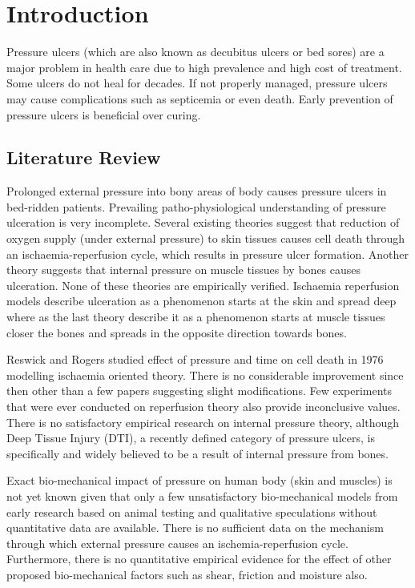 \chapter{Introduction}
\label{chapter:introduction}

Pressure ulcers (which are also known as decubitus ulcers or bed sores) are a major problem in health care due to high prevalence and high cost of treatment. Some ulcers do not heal for decades. If not properly managed, pressure ulcers may cause complications such as septicemia or even death. Early prevention of pressure ulcers is beneficial over curing. 


\section{Literature Review}
Prolonged external pressure into bony areas of body causes pressure ulcers in bed-ridden patients. Prevailing patho-physiological understanding of pressure ulceration is very incomplete. Several existing theories suggest that reduction of oxygen supply (under external pressure) to skin tissues causes cell death through an ischaemia-reperfusion cycle, which results in pressure ulcer formation. Another theory suggests that internal pressure on muscle tissues by bones causes ulceration. None of these theories are empirically verified. Ischaemia reperfusion models describe ulceration as a phenomenon starts at the skin and spread deep where as the last theory describe it as a phenomenon starts at muscle tissues closer the bones and spreads in the opposite direction towards bones. 

Reswick and Rogers studied effect of pressure and time on cell death in 1976 modelling ischaemia oriented theory. There is no considerable improvement since then other than a few papers suggesting slight modifications. Few experiments that were ever conducted on reperfusion theory also provide inconclusive values. There is no satisfactory empirical research on internal pressure theory, although Deep Tissue Injury (DTI), a recently defined category of pressure ulcers, is specifically and widely believed to be a result of internal pressure from bones. 


Exact bio-mechanical impact of pressure on human body (skin and muscles) is not yet known given that only a few unsatisfactory bio-mechanical models from early research based on animal testing and qualitative speculations without quantitative data are available. There is no sufficient data on the mechanism through which external pressure causes an ischemia-reperfusion cycle. Furthermore, there is no quantitative empirical evidence for the effect of other proposed bio-mechanical factors such as shear, friction and moisture also. 

